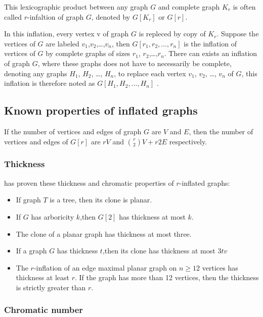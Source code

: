 This lexicographic product between any graph $G$ and complete graph $K_r$ is often called $r$-infaltion of graph $G$, denoted by $G[K_r]$ or $G[r]$.

In this inflation, every vertex v of graph $G$ is repleced by copy of $K_r$. Suppose the vertices of $G$ are labeled $v_1$,$v_2$,\dots,$v_n$, then $G[r_1, r_2,\dots,r_n]$ is the inflation of vertices of $G$ by complete graphs of sizes $ r_1$, $r_2$,\dots,$r_n$. There can exists an inflation of graph $G$, where these graphs does not have to necessarily be complete, denoting any graphs $H_1$, $H_2$, \dots, $H_n$, to replace each vertex $v_1$, $v_2$, \dots, $v_n$ of $G$, this inflation is therefore noted as $G[H_1, H_2,\dots,H_n]$ \parencite{Gethner2018toTheMoonAndBack}.

\subsection{Known properties of inflated graphs}

If the number of vertices and edges of graph $G$ are $V$ and $E$, then the number of vertices and edges of $G[r]$ are $rV$ and $\binom{r}{2} V+r2E$ respectively.

\subsubsection{Thickness}

\textcite{ALBERTSON20102725} has proven these thickness and chromatic properties of $r$-inflated graphs:
\begin{itemize}

\item If graph $T$ is a tree, then its clone is planar.
\item If $G$ has arboricity $k$,then $G[2]$ has thickness at most $k$.
\item The clone of a planar graph has thickness at most three.
\item If a graph $G$ has thickness $t$,then its clone has thickness at most $3tv$
\item The $r$-inflation of an edge maximal planar graph on  $n \geq 12$ vertices has thickness at least $r$. If the graph has more than 12 vertices, then the thickness is strictly greater than $r$.

\end{itemize}

\subsubsection{Chromatic number}

